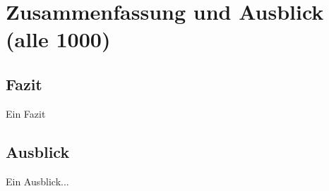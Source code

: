 \chapter{Zusammenfassung und Ausblick (alle 1000)}
\label{sec:ZusammenfassungUndAusblick}

\section{Fazit}
\label{sec:Fazit}

Ein Fazit

\section{Ausblick}
\label{sec:Ausblick}

Ein Ausblick...



